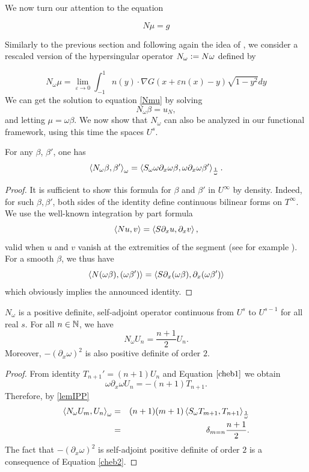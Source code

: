 \documentclass[a4paper]{article}
\begin{document}
We now turn our attention to the equation 

\begin{equation}
N\mu = g
\label{Nmu}
\end{equation} 

Similarly to the previous section and following again the idea of \cite{bruno2012second}, we consider a rescaled version of the hypersingular operator $N_\omega \mathrel{\mathop:}= N \omega$ defined by

\[N_\omega \mu = \lim_{\varepsilon\to 0}\int_{-1}^{1} n(y)\cdot\nabla G(x + \varepsilon n(x) - y) \sqrt{1-y^2} dy\]
We can get the solution to equation \eqref{Nmu} by solving 
\begin{equation}
N_\omega \beta = u_N,
\label{Nomegabeta}
\end{equation}
and letting $\mu = \omega \beta$. 
We now show that $N_\omega$ can also be analyzed in our functional framework, using this time the spaces $U^s$. 
\begin{Lem}
	\label{lemIPP}
	For any $\beta$, $\beta'$, one has 
	\[\left\langle N_\omega \beta, \beta'\right\rangle_\omega = \left\langle S_\omega \omega \partial_x \omega \beta,\omega \partial_x \omega \beta'\right\rangle_\frac{1}{\omega}.\]
	\begin{proof}
		It is sufficient to show this formula for $\beta$ and $\beta'$ in $U^{\infty}$ by density. Indeed, for such $\beta, \beta'$, both sides of the identity define continuous bilinear forms on $T^{\infty}$. We use the well-known integration by part formula
		\[\left\langle N u,v\right\rangle = \left\langle S\partial_x u,\partial_x v\right\rangle,\]
		valid when $u$ and $v$ vanish at the extremities of the segment (see for example \cite{bruno2012second}). 
		For a smooth $\beta$, we thus have
		\[ \left\langle N (\omega \beta), (\omega \beta')\right\rangle = \left\langle S \partial_x(\omega \beta),\partial_x (\omega \beta')\right\rangle\] 
		which obviously implies the announced identity. 
	\end{proof}
\end{Lem}
\begin{Prop}
	$N_\omega$ is a positive definite, self-adjoint operator continuous from $U^s$ to $U^{s-1}$ for all real $s$. For all $n \in \mathbb{N}$, we have 
	\[N_\omega U_n = \frac{n+1}{2}U_n.\]
	Moreover, $-(\partial_x\omega)^2$ is also positive definite of order $2$.
	\label{NUn}
\end{Prop}
\begin{proof}
	From identity $T_{n+1}' = (n+1)U_n$ and Equation $\eqref{cheb1}$ we obtain
	\begin{equation*}
	\omega \partial_x \omega U_n = -(n+1) T_{n+1}.
	\end{equation*}
	Therefore, by \autoref{lemIPP}
	\begin{eqnarray*}
		\left\langle N_\omega U_m,U_n\right\rangle_\omega & = & (n+1)(m+1)\left\langle S_\omega T_{m+1},T_{n+1}\right\rangle_\frac{1}{\omega}\\
		&=& \delta_{m=n} \frac{n+1}{2}.	
	\end{eqnarray*}
	The fact that $-(\partial_x \omega)^2$ is self-adjoint positive definite of order $2$ is a consequence of Equation \eqref{cheb2}.
\end{proof}
\end{document}
